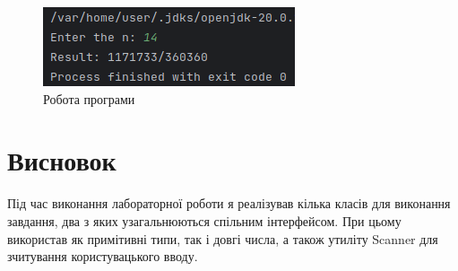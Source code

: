 \documentclass[14pt]{extreport}
\begin{document}
\begin{normalsize}
	\begin{figure}[H]
		\centering
		\includegraphics[scale=1]{1}
		\caption{Робота програми}
	\end{figure}

	\section*{Висновок}
	Під час виконання лабораторної роботи я реалізував кілька класів для виконання завдання, два з яких узагальнюються спільним інтерфейсом. При цьому використав як примітивні типи, так і довгі числа, а також утиліту Scanner для зчитування користувацького вводу.
	 
\end{normalsize}
\end{document}
